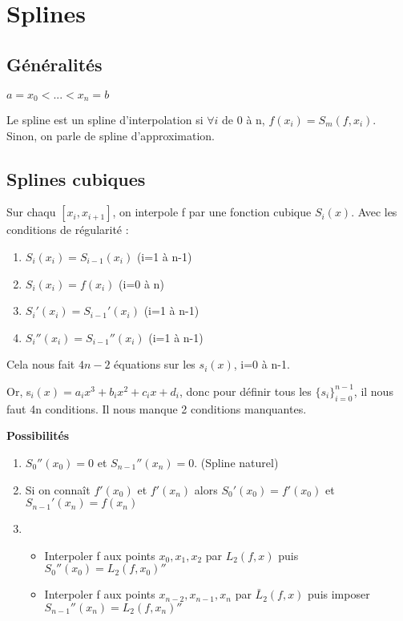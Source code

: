 \section{Splines}
\subsection{Généralités}
$a=x_0<...<x_n=b$

Le spline est un spline d'interpolation si $\forall i$ de 0 à n, $f(x_i)=S_m(f,x_i)$.\\
Sinon, on parle de spline d'approximation.

\subsection{Splines cubiques}
Sur chaqu $[x_i,x_{i+1}]$, on interpole f par une fonction cubique $S_i(x)$. Avec les conditions de régularité : 
\begin{enumerate}
	\item $S_i(x_i)=S_{i-1}(x_i)$ (i=1 à n-1)
	\item $S_i(x_i)=f(x_i)$ (i=0 à n)
	\item $S_i'(x_i)=S_{i-1}'(x_i)$ (i=1 à n-1)
	\item $S_i''(x_i)=S_{i-1}''(x_i)$ (i=1 à n-1)
\end{enumerate}

Cela nous fait $4n-2$ équations sur les $s_i(x)$, i=0 à n-1.

Or, s$_i(x)=a_ix^3+b_ix^2+c_ix+d_i$, donc pour définir tous les $\{s_i\}_{i=0}^{n-1}$, il nous faut 4n conditions. Il nous manque 2 conditions manquantes.

\bigskip
\textbf{Possibilités}
\begin{enumerate}
	\item $S_0''(x_0)=0$ et $S_{n-1}''(x_n)=0$. (Spline naturel)
	\item Si on connaît $f'(x_0)$ et $f'(x_n)$ alors $S_0'(x_0)=f'(x_0)$ et $S_{n-1}'(x_n)=f(x_n)$
	\item \begin{itemize}
			\item Interpoler f aux points $x_0,x_1,x_2$ par $L_2(f,x)$ puis $S_0''(x_0)=L_2(f,x_0)''$
			\item Interpoler f aux points $x_{n-2},x_{n-1},x_n$ par $\bar{L}_2(f,x)$ puis imposer $S_{n-1}''(x_n)=L_2(f,x_n)''$
		\end{itemize}		
\end{enumerate}
